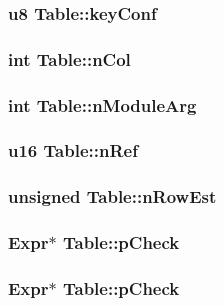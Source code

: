 \subsubsection{\setlength{\rightskip}{0pt plus 5cm}\bf{u8} \bf{Table::key\-Conf}}\label{structTable_cf6dbfb709272d6961ed2d14d38ae90b}


\subsubsection{\setlength{\rightskip}{0pt plus 5cm}int \bf{Table::n\-Col}}\label{structTable_2c84c2d2d71386483987d40936b18cf3}


\subsubsection{\setlength{\rightskip}{0pt plus 5cm}int \bf{Table::n\-Module\-Arg}}\label{structTable_8845338b11949d03fa51a4b06feb1d0c}


\subsubsection{\setlength{\rightskip}{0pt plus 5cm}\bf{u16} \bf{Table::n\-Ref}}\label{structTable_440c843764fb19bc7fdc5a65443dd5dd}


\subsubsection{\setlength{\rightskip}{0pt plus 5cm}unsigned \bf{Table::n\-Row\-Est}}\label{structTable_6a844834fd952d782e8531236ea3efda}


\subsubsection{\setlength{\rightskip}{0pt plus 5cm}\bf{Expr}$\ast$ \bf{Table::p\-Check}}\label{structTable_a8ec2dab732a5a6b6e6961cc2212db53}


\subsubsection{\setlength{\rightskip}{0pt plus 5cm}\bf{Expr}$\ast$ \bf{Table::p\-Check}}\label{structTable_a8ec2dab732a5a6b6e6961cc2212db53}


